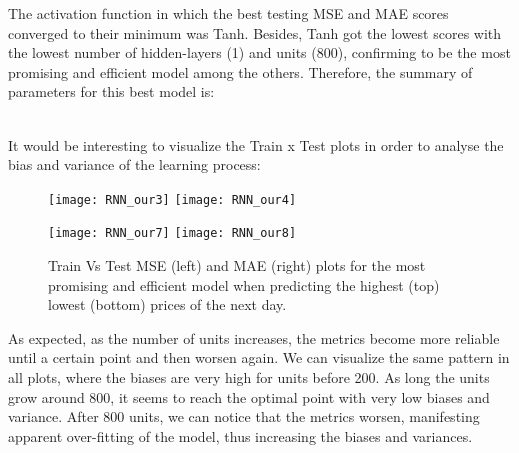 The activation function in which the best testing MSE and MAE scores converged to their minimum was Tanh. Besides, Tanh got the lowest scores with the lowest number of hidden-layers (1) and units (800), confirming to be the most promising and efficient model among the others. Therefore, the summary of parameters for this best model is: \\

\begin{table}[H]
\centering
{}
\label{table:Tanh, 1, 800, 50, 1, MSE}
\caption{Summary of parameters for our best model.}
\end{table}\\

It would be interesting to visualize the Train x Test plots in order to analyse the bias and variance of the learning process:\\

\begin{figure}[H]
\label{fig:RNN train vs test for highest}
\centering
\texttt{[image: RNN\_our3]}
\texttt{[image: RNN\_our4]}
\end{figure}

\begin{figure}[H]
\label{fig:RNN train vs test for lowest}
\centering
\texttt{[image: RNN\_our7]}
\texttt{[image: RNN\_our8]}
\caption{Train Vs Test MSE (left) and MAE (right) plots for the most promising and efficient model when predicting the highest (top) lowest (bottom) prices of the next day.}
\end{figure}

As expected, as the number of units increases, the metrics become more reliable until a certain point and then worsen again. We can visualize the same pattern in all plots, where the biases are very high for units before 200. As long the units grow around 800, it seems to reach the optimal point with very low biases and variance. After 800 units, we can notice that the metrics worsen, manifesting apparent over-fitting of the model, thus increasing the biases and variances.\\

